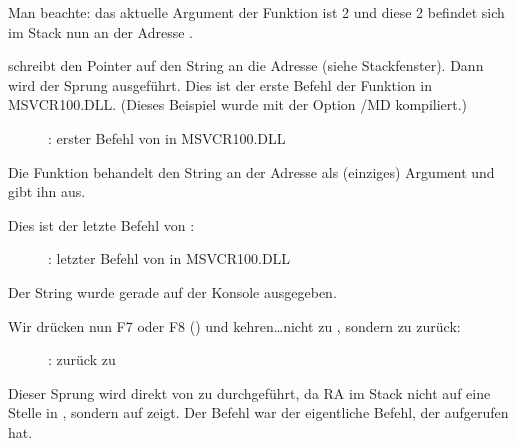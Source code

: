 Man beachte: das aktuelle Argument der Funktion ist 2 und diese 2 befindet sich im Stack nun an der Adresse
.

\clearpage
\MOV schreibt den Pointer auf den String an die Adresse  (siehe Stackfenster).
Dann wird der Sprung ausgeführt. Dies ist der erste Befehl der Funktion \printf in MSVCR100.DLL. (Dieses Beispiel wurde
mit der Option /MD kompiliert.)
 

\begin{figure}[H]
\centering
{}
\caption{\olly: erster Befehl von \printf in MSVCR100.DLL}
\label{fig:switch_few_olly6}
\end{figure}

Die Funktion \printf behandelt den String an der Adresse  als (einziges) Argument und gibt ihn aus.

\clearpage
Dies ist der letzte Befehl von \printf:

\begin{figure}[H]
\centering
{}
\caption{\olly: letzter Befehl von \printf in MSVCR100.DLL}
\label{fig:switch_few_olly7}
\end{figure}

Der String  wurde gerade auf der Konsole ausgegeben.

\clearpage
Wir drücken nun F7 oder F8 (\stepover) und kehren\dots nicht zu \ttf , sondern zu \main zurück:

\begin{figure}[H]
\centering
{}
\caption{\olly: zurück zu \main}
\label{fig:switch_few_olly8}
\end{figure}
Dieser Sprung wird direkt von \printf zu \main durchgeführt, da \ac{RA} im Stack nicht auf eine Stelle in \ttf, sondern
auf \main zeigt.
Der Befehl \CALL {} war der eigentliche Befehl, der \ttf aufgerufen hat.

